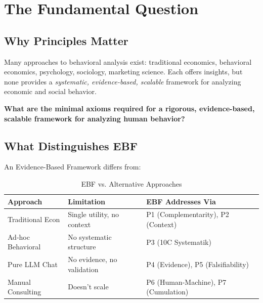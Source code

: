 \section{The Fundamental Question}
\label{sec:pr-fundamental}

\subsection{Why Principles Matter}

Many approaches to behavioral analysis exist: traditional economics, behavioral economics, psychology, sociology, marketing science. Each offers insights, but none provides a \textit{systematic, evidence-based, scalable} framework for analyzing economic and social behavior.

\begin{tcolorbox}[colback=red!5!white, colframe=red!75!black,
    title=The Fundamental Question]
\textbf{What are the minimal axioms required for a rigorous, evidence-based, scalable framework for analyzing human behavior?}
\end{tcolorbox}

\subsection{What Distinguishes EBF}

An Evidence-Based Framework differs from:

\begin{table}[htbp]
\centering
\caption{EBF vs. Alternative Approaches}
\label{tab:pr-comparison}
\renewcommand{\arraystretch}{1.4}
\begin{tabular}{@{}p{3cm}p{4cm}p{5cm}@{}}
\toprule
\textbf{Approach} & \textbf{Limitation} & \textbf{EBF Addresses Via} \\
\midrule
Traditional Econ & Single utility, no context & P1 (Complementarity), P2 (Context) \\
Ad-hoc Behavioral & No systematic structure & P3 (10C Systematik) \\
Pure LLM Chat & No evidence, no validation & P4 (Evidence), P5 (Falsifiability) \\
Manual Consulting & Doesn't scale & P6 (Human-Machine), P7 (Cumulation) \\
\bottomrule
\end{tabular}
\end{table}



